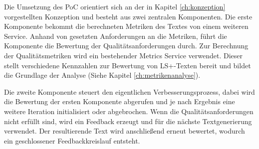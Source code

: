 
Die Umsetzung des PoC orientiert sich an der in Kapitel \ref{ch:konzeption} vorgestellten Konzeption und besteht aus zwei zentralen Komponenten.
Die erste Komponente bekommt die berechneten Metriken des Textes von einem weiteren Service. 
Anhand von gesetzten Anforderungen an die Metriken, führt die Komponente die Bewertung der Qualitätsanforderungen durch.
Zur Berechnung der Qualitätsmetriken wird ein bestehender Metrics Service verwendet.
Dieser stellt verschiedene Kennzahlen zur Bewertung von LS+-Texten bereit und bildet die Grundlage der Analyse (Siehe Kapitel \ref{ch:metrikenanalyse}).

Die zweite Komponente steuert den eigentlichen Verbesserungsprozess, dabei wird die Bewertung der ersten Komponente abgerufen und je nach Ergebnis eine weitere Iteration initialisiert oder abgebrochen.
Wenn die Qualitätsanforderungen nicht erfüllt sind, wird ein Feedback erzeugt und für die nächste Textgenerierung verwendet.
Der resultierende Text wird anschließend erneut bewertet, wodurch ein geschlossener Feedbackkreislauf entsteht.